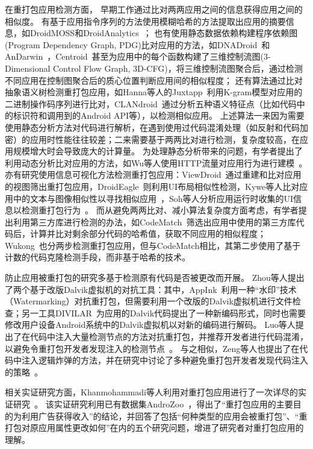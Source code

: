 在重打包应用检测方面，
早期工作通过比对两两应用之间的信息获得应用之间的相似度。
有基于应用指令序列的方法使用模糊哈希的方法提取出应用的摘要信息，如DroidMOSS和DroidAnalytics~\cite{DroidMOSS, Zheng2013DroidAnalyticsA}；
也有使用静态数据依赖构建程序依赖图(Program Dependency Graph, PDG)比对应用的方法，如DNADroid~\cite{DNADroid}和AnDarwin~\cite{AnDarwin}，Centroid~\cite{Centroid}甚至为应用中的每个函数构建了三维控制流图(3-Dimensional Control Flow Graph, 3D-CFG)，将三维控制流图聚合后，通过检测不同应用在控制图聚合后的质心位置判断应用间的相似程度；
还有算法通过比对抽象语义树检测重打包应用，如Hanna等人的Juxtapp~\cite{hanna2012juxtapp}利用K-gram模型对应用的二进制操作码序列进行比对，CLANdroid~\cite{CLANdroid}通过分析五种语义特征点（比如代码中的标识符和调用到的Android API等），以检测相似应用。
上述算法一来因为需要使用静态分析方法对代码进行解析，在遇到使用过代码混淆处理（如反射和代码加密）的应用时性能往往较差；二来需要基于两两比对进行检测，复杂度较高，在应用规模增大时会导致庞大的计算量。
为处理静态分析带来的问题，有学者提出了利用动态分析比对应用的方法，如Wu等人使用HTTP流量对应用行为进行建模~\cite{wu2015detect}。
亦有研究使用信息可视化方法检测重打包应用：ViewDroid~\cite{ViewDroid}通过重建和比对应用的视图筛出重打包应用，DroidEagle~\cite{sun2015droideagle}则利用UI布局相似性检测，Kywe等人比对应用中的文本与图像相似性以寻找相似应用~\cite{kywe2014detecting}，Soh等人分析应用运行时收集的UI信息以检测重打包行为~\cite{soh2015detecting}。
而从避免两两比对、减小算法复杂度方面考虑，有学者提出利用第三方库进行检测的办法，如CodeMatch~\cite{CodeMatch}筛选出应用中使用的第三方库代码后，计算并比对剩余部分代码的哈希值，获取不同应用的相似程度；Wukong~\cite{Wukong}也分两步检测重打包应用，但与CodeMatch相比，其第二步使用了基于计数的代码克隆检测手段，而非基于哈希的技术。

防止应用被重打包的研究多基于检测原有代码是否被更改而开展。
Zhou等人提出了两个基于改版Dalvik虚拟机的对抗工具：其中，AppInk~\cite{zhou2013appink}利用一种``水印''技术（Watermarking）对抗重打包，但需要利用一个改版的Dalvik虚拟机进行文件检查；另一工具DIVILAR~\cite{zhou2014divilar}为应用的Dalvik代码提出了一种新编码形式，同时也需要修改用户设备Android系统中的Dalvik虚拟机以对新的编码进行解码。
Luo等人提出了在代码中注入大量检测节点的方法对抗重打包，并推荐开发者进行代码混淆，以避免令重打包开发者发现注入的检测节点~\cite{luo2016repackage}。
与之相似，Zeng等人也提出了在代码中注入逻辑炸弹的方法，并在研究中讨论了多种避免重打包开发者发现代码注入的策略~\cite{zeng2018resilient}。

相关实证研究方面，Khanmohammadi等人利用对重打包应用进行了一次详尽的实证研究~\cite{khanmohammadi2019empirical}。
该实证研究利用已有数据集AndroZoo~\cite{li2017androzoo++}，得出了``重打包应用的主要目的为利用广告获得收入''的结论，并回答了包括``何种类型的应用会被重打包''、``重打包对原应用属性更改如何''在内的五个研究问题，增进了研究者对重打包应用的理解。

